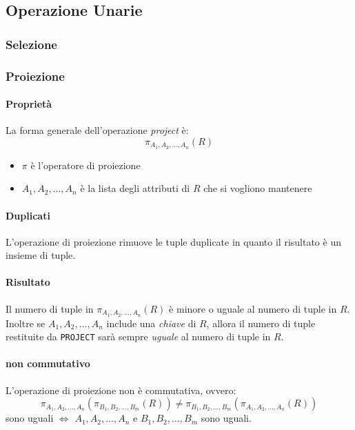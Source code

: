     \subsection{Operazione Unarie}
        \subsubsection{Selezione}
        \subsubsection{Proiezione}
            \paragraph{Proprietà} La forma generale dell'operazione \textit{project} è:
                $$
                    \pi_{A_1, A_2, \dots, A_n} (R)
                $$
                \begin{itemize}
                    \item $\pi$ è l'operatore di proiezione
                    \item $A_1, A_2, \dots, A_n$ è la lista degli attributi di $R$ che si vogliono mantenere
                \end{itemize}
            \paragraph{Duplicati} L'operazione di proiezione rimuove le tuple duplicate in quanto il risultato è un insieme di tuple.
            \paragraph{Risultato} Il numero di tuple in $ \pi_{A_1, A_2, \dots, A_n} (R) $ è minore o uguale al numero di tuple in $R$. Inoltre se $ A_1, A_2, \dots, A_n $ include una \textit{chiave} di $ R $, allora il numero di tuple restituite da \texttt{PROJECT} sarà sempre \textit{uguale} al numero di tuple in $ R $.
            \paragraph{non commutativo} L'operazione di proiezione non è commutativa, ovvero:
                $$
                    \pi_{A_1, A_2, \dots, A_n} ( \pi_{B_1, B_2, \dots, B_m} (R) ) \neq \pi_{B_1, B_2, \dots, B_m} ( \pi_{A_1, A_2, \dots, A_n} (R) )
                $$
                sono uguali $ \Leftrightarrow $ $ A_1, A_2, \dots, A_n $ e $ B_1, B_2, \dots, B_m $ sono uguali.
